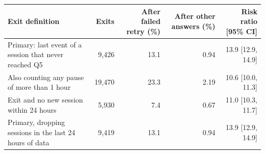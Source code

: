 \begin{tabular}{@{}lrrrr@{}}\toprule
Exit definition & Exits & After failed retry (\%) & After other answers (\%) & Risk ratio [95\% CI] \\\midrule
Primary: last event of a session that never reached Q5 & 9{,}426 & 13.1 & 0.94 & 13.9 [12.9, 14.9] \\
Also counting any pause of more than 1 hour & 19{,}470 & 23.3 & 2.19 & 10.6 [10.0, 11.3] \\
Exit and no new session within 24 hours & 5{,}930 & 7.4 & 0.67 & 11.0 [10.3, 11.7] \\
Primary, dropping sessions in the last 24 hours of data & 9{,}419 & 13.1 & 0.94 & 13.9 [12.9, 14.9] \\
\bottomrule\end{tabular}
